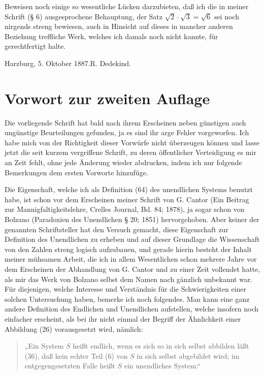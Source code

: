 \documentclass[11pt]{article}
\begin{document}
Beweisen noch einige so wesentliche Lücken darzubieten, daß ich die in meiner Schrift (§ 6) ausgesprochene Behauptung, der Satz $\sqrt{2}\cdot\sqrt{3}=\sqrt{6}$ sei noch nirgends streng bewiesen, auch in Hinsicht auf dieses in mancher anderen Beziehung treffliche Werk, welches ich damals noch nicht kannte, für gerechtfertigt halte.

\begin{flushright}Harzburg, 5. Oktober 1887.\qquad R. Dedekind.\end{flushright}

\section*{Vorwort zur zweiten Auflage}

Die vorliegende Schrift hat bald nach ihrem Erscheinen neben günstigen auch ungünstige Beurteilungen gefunden, ja es sind ihr arge Fehler vorgeworfen. Ich habe mich von der Richtigkeit dieser Vorwürfe nicht überzeugen können und lasse jetzt die seit kurzem vergriffene Schrift, zu deren öffentlicher Verteidigung es mir an Zeit fehlt, ohne jede Änderung wieder abdrucken, indem ich nur folgende Bemerkungen dem ersten Vorworte hinzufüge.

Die Eigenschaft, welche ich als Definition (64) des unendlichen Systems benutzt habe, ist schon vor dem Erscheinen meiner Schrift von G. Cantor (Ein Beitrag zur Mannigfaltigkeitslehre, Crelles Journal, Bd. 84; 1878), ja sogar schon von Bolzano (Paradoxien des Unendlichen § 20; 1851) hervorgehoben. Aber keiner der genannten Schriftsteller hat den Versuch gemacht, diese Eigenschaft zur Definition des Unendlichen zu erheben und auf dieser Grundlage die Wissenschaft von den Zahlen streng logisch aufzubauen, und gerade hierin besteht der Inhalt meiner mühsamen Arbeit, die ich in allem Wesentlichen schon mehrere Jahre vor dem Erscheinen der Abhandlung von G. Cantor und zu einer Zeit vollendet hatte, als mir das Werk von Bolzano selbst dem Namen nach gänzlich unbekannt war. Für diejenigen, welche Interesse und Verständnis für die Schwierigkeiten einer solchen Untersuchung haben, bemerke ich noch folgendes. Man kann eine ganz andere Definition des Endlichen und Unendlichen aufstellen, welche insofern noch einfacher erscheint, als bei ihr nicht einmal der Begriff der Ähnlichkeit einer Abbildung (26) vorausgesetzt wird, nämlich:

\begin{quote}„Ein System $S$ heißt endlich, wenn es sich so in sich selbst abbilden läßt (36), daß kein echter Teil (6) von $S$ in sich selbst abgebildet wird; im entgegengesetzten Falle heißt $S$ ein unendliches System.``\end{quote}
\end{document}
